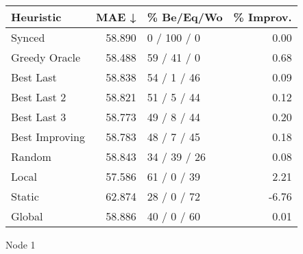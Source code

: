 \begin{tabular}{lrlr}
\toprule
\textbf{Heuristic} & \textbf{MAE ↓} & \textbf{\% Be/Eq/Wo} & \textbf{\% Improv.} \\
\midrule
            Synced &         58.890 &          0 / 100 / 0 &                0.00 \\
     Greedy Oracle &         58.488 &          59 / 41 / 0 &                0.68 \\
         Best Last &         58.838 &          54 / 1 / 46 &                0.09 \\
       Best Last 2 &         58.821 &          51 / 5 / 44 &                0.12 \\
       Best Last 3 &         58.773 &          49 / 8 / 44 &                0.20 \\
    Best Improving &         58.783 &          48 / 7 / 45 &                0.18 \\
            Random &         58.843 &         34 / 39 / 26 &                0.08 \\
             Local &         57.586 &          61 / 0 / 39 &                2.21 \\
            Static &         62.874 &          28 / 0 / 72 &               -6.76 \\
            Global &         58.886 &          40 / 0 / 60 &                0.01 \\
\bottomrule
\end{tabular}
\caption{Node 1}
\label{tab:non_lr01_le2_bs4_1}
